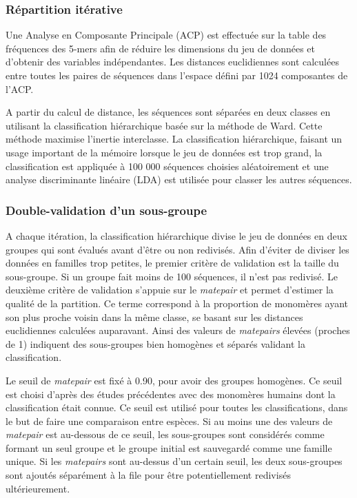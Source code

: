\documentclass[12pt,a4paper]{article}
\begin{document}
	\subsubsection{Répartition itérative}
Une Analyse en Composante Principale (ACP) est effectuée sur la table des fréquences des 5-mers afin de réduire les dimensions du jeu de données et d’obtenir des variables indépendantes. Les distances euclidiennes sont calculées entre toutes les paires de séquences dans l’espace défini par 1024 composantes de l’ACP. 

A partir du calcul de distance, les séquences sont séparées en deux classes en utilisant la classification hiérarchique basée sur la méthode de Ward. Cette méthode maximise l’inertie interclasse. La classification hiérarchique, faisant un usage important de la mémoire lorsque le jeu de données est trop grand, la classification est appliquée à 100 000 séquences choisies aléatoirement et une analyse discriminante linéaire (LDA) est utilisée pour classer les autres séquences.

	\subsubsection{Double-validation d'un sous-groupe}
A chaque itération, la classification hiérarchique divise le jeu de données en deux groupes qui sont évalués avant d'être ou non redivisés. Afin d'éviter de diviser les données en familles trop petites, le premier critère de validation est la taille du sous-groupe. Si un groupe fait moins de 100 séquences, il n'est pas redivisé. Le deuxième critère de validation s'appuie sur le \textit{matepair} et permet d'estimer la qualité de la partition. Ce terme correspond à la proportion de monomères ayant son plus proche voisin dans la même classe, se basant sur les distances euclidiennes calculées auparavant. Ainsi des valeurs de \textit{matepairs} élevées (proches de 1) indiquent des sous-groupes bien homogènes et séparés validant la classification.
 
Le seuil de \textit{matepair} est fixé à 0.90, pour avoir des groupes homogènes. Ce seuil est choisi d'après des études précédentes avec des monomères humains dont la classification était connue. Ce seuil est utilisé pour toutes les classifications, dans le but de faire une comparaison entre espèces. Si au moins une des valeurs de \textit{matepair} est au-dessous de ce seuil, les sous-groupes sont considérés comme formant un seul groupe et le groupe initial est sauvegardé comme une famille unique. Si les \textit{matepairs} sont au-dessus d’un certain seuil, les deux sous-groupes sont ajoutés séparément à la file pour être potentiellement redivisés ultérieurement.
\end{document}
